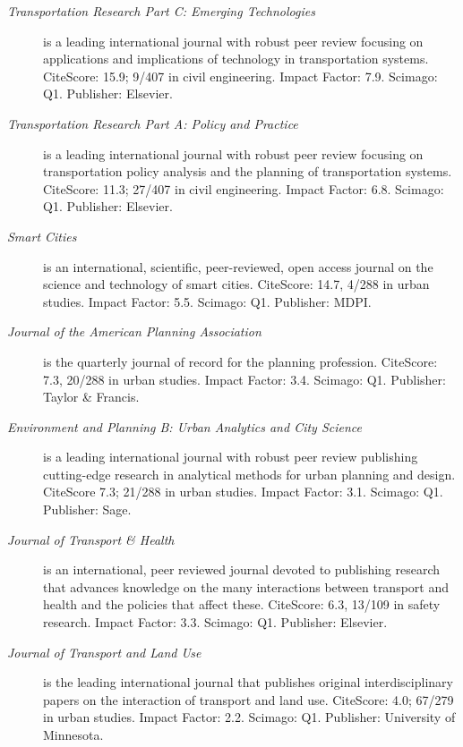 \documentclass[margin,line]{res}
\begin{document}
\begin{resume}
\begin{description}
  \item[\textit{Transportation Research Part C: Emerging Technologies}] is a
  leading international journal with robust peer review focusing on applications
  and implications of technology in transportation systems.
  CiteScore: 15.9; 9/407 in civil engineering.  Impact Factor: 7.9. Scimago: Q1. Publisher: Elsevier.
  \item[\textit{Transportation Research Part A: Policy and Practice}] is
   a leading international journal with robust peer review focusing on
   transportation policy  analysis and the planning of transportation systems.
   CiteScore: 11.3; 27/407 in civil engineering. Impact Factor: 6.8. Scimago: Q1. Publisher: Elsevier.
  \item[\textit{Smart Cities}] is an international, scientific, peer-reviewed,
  open access journal on the science and technology of smart cities. CiteScore:
  14.7, 4/288 in urban studies. Impact Factor: 5.5. Scimago: Q1. Publisher: MDPI.
  \item[\textit{Journal of the American Planning Association}] is the quarterly
  journal of record for the planning profession. CiteScore: 7.3, 20/288 in urban studies. 
  Impact Factor: 3.4. Scimago: Q1.  Publisher: Taylor \& Francis.
  \item[\textit{Environment and Planning B: Urban Analytics and City Science}]
  is a leading international journal with robust peer review publishing
  cutting-edge research in analytical methods for urban planning and
  design. CiteScore 7.3; 21/288 in urban studies. Impact Factor: 3.1. Scimago: Q1. Publisher: Sage.
  \item[\textit{Journal of Transport \& Health}] is an international, peer reviewed journal devoted to publishing research that advances knowledge on the many interactions between transport and health and the policies that affect these. CiteScore: 6.3, 13/109 in safety research. Impact Factor: 3.3. Scimago: Q1. Publisher: Elsevier.
  \item[\textit{Journal of Transport and Land Use}] is the leading
  international journal that publishes original interdisciplinary papers on the
  interaction of transport and land use. CiteScore: 4.0; 67/279 in urban
  studies. Impact Factor: 2.2. Scimago: Q1. Publisher: University of Minnesota.

\end{description}
\end{resume}
\end{document}
